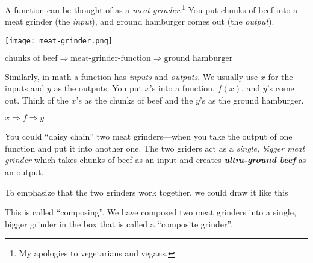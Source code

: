 \documentclass[fleqn,letterpaper,12pt,printwatermark=false]{memoir}
\begin{document}
\begin{myLesson}
    A function can be thought of as a \emph{meat grinder}.\footnote{
        My apologies to vegetarians and vegans.
    }
    You put chunks of beef into a meat grinder (the \emph{input}),
    and ground hamburger comes out (the \emph{output}). 

    \begin{center}
    \texttt{[image: meat-grinder.png]} 
    \end{center}

    \begin{center}
    \(
        \text{chunks of beef}
        \Longrightarrow
        \text{meat-grinder-function}
        \Longrightarrow
        \text{ground hamburger}
    \)
    \end{center}

    Similarly,
    in math a function has \emph{inputs} and \emph{outputs}.
    We usually use $x$ for the inputs and $y$ as the outputs.
    You put $x$'s into a function, $f(x)$,
    and $y$'s come out.
    Think of the $x$'s as the chunks of beef
    and the $y$'s as the ground hamburger.
    \begin{center}
    \(
        x
        \Longrightarrow
        f
        \Longrightarrow
        y
    \)
    \end{center}

    You could ``daisy chain'' two meat grinders---when 
    you take the output of one function and put it into
    another one.
    The two griders act as a  
    \emph{single, bigger meat grinder} which takes chunks of beef
    as an input and creates 
    {\bfseries\itshape ultra-ground beef} as an output.

    \begin{center}
    \end{center}
    To emphasize that the two grinders work together, 
    we could draw it like this
    \begin{center}
    \end{center}
    This is called ``composing''. 
    We have composed two meat grinders
    into a single, bigger grinder in the box that is called 
    a ``composite grinder''.


\end{myLesson}
\end{document}
